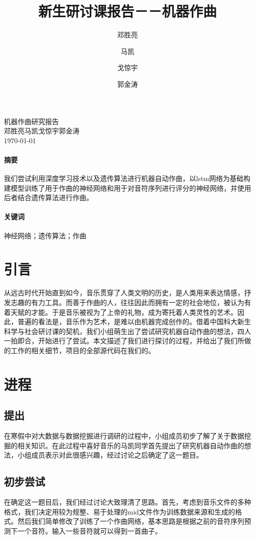\documentclass{article}
\title{新生研讨课报告－－机器作曲}
\author{邓胜亮\and 马凯\and 戈惊宇\and 郭金涛}
\begin{document}
\begin{titlepage}
\centering
{}
{\fontsize{40}{50} 机器作曲研究报告}\\
{\Large 邓胜亮\quad 马凯\quad 戈惊宇\quad 郭金涛}\\
{\today}
\end{titlepage}

\paragraph{摘要}
我们尝试利用深度学习技术以及遗传算法进行机器自动作曲，以lstm网络为基础构建模型训练了用于作曲的神经网络和用于对音符序列进行评分的神经网络，并使用后者结合遗传算法进行作曲。
\paragraph{关键词} 神经网络；遗传算法；作曲

\newpage
\renewcommand{\contentsname}{目录}
\tableofcontents

\newpage
\section{引言}
从远古时代开始直到如今，音乐贯穿了人类文明的历史，是人类用来表达情感，抒发志趣的有力工具。而善于作曲的人，往往因此而拥有一定的社会地位，被认为有着天赋的才能。于是音乐被视为了上帝的礼物，成为寄托着人类灵性的艺术。因此，普遍的看法是，音乐作为艺术，是难以由机器完成创作的。借着中国科大新生科学与社会研讨课的契机，我们小组萌生出了尝试研究机器自动作曲的想法，四人一拍即合，开始进行了尝试。本文描述了我们进行探讨的过程，并给出了我们所做的工作的相关细节，项目的全部源代码在我们的\cite{memory-lost musician}。
\section{进程}
    \subsection{提出}
    在寒假中对大数据与数据挖掘进行调研的过程中，小组成员初步了解了关于数据挖掘的相关知识。在此过程中喜好音乐的马凯同学首先提出了研究机器自动作曲的想法，小组成员表示对此很感兴趣，经过讨论之后确定了这一题目。
    \subsection{初步尝试}
    在确定这一题目后，我们经过讨论大致理清了思路。首先，考虑到音乐文件的多种格式，我们决定用较为规整、易于处理的mid文件作为训练数据来源和生成的格式。然后我们简单修改了\cite{char-rnn}训练了一个作曲网络，基本思路是根据之前的音符序列预测下一个音符。输入一些音符就可以得到一首曲子。
\end{document}
